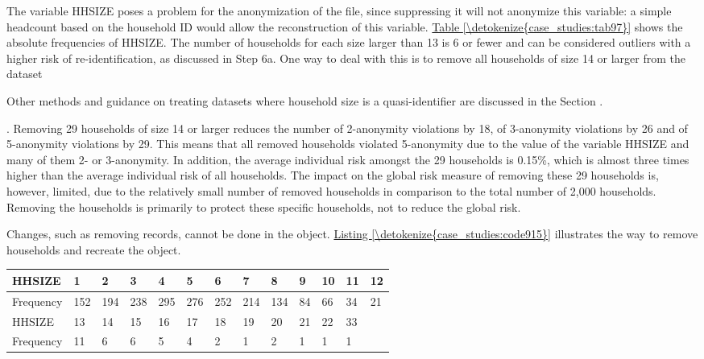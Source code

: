 \documentclass[letterpaper,10pt,english]{sphinxmanual}
\begin{document}

The variable HHSIZE poses a problem for the anonymization of the file,
since suppressing it will not anonymize this variable: a simple
headcount based on the household ID would allow the reconstruction of
this variable. \hyperref[\detokenize{case_studies:tab97}]{Table \ref{\detokenize{case_studies:tab97}}} shows the absolute frequencies of HHSIZE. The
number of households for each size larger than 13 is 6 or fewer and can
be considered outliers with a higher risk of re-identification, as
discussed in Step 6a. One way to deal with this is to remove all
households of size 14 or larger from the dataset %
\begin{footnote}[1]\sphinxAtStartFootnote
Other methods and guidance on treating datasets where household size
is a quasi-identifier are discussed in the Section
.
%
\end{footnote}.
Removing 29 households of size 14 or larger reduces the number of
2-anonymity violations by 18, of 3-anonymity violations by 26 and of
5-anonymity violations by 29. This means that all removed households
violated 5-anonymity due to the value of the variable HHSIZE and many of
them 2- or 3-anonymity. In addition, the average individual risk amongst
the 29 households is 0.15\%, which is almost three times higher than the
average individual risk of all households. The impact on the global risk
measure of removing these 29 households is, however, limited, due to the
relatively small number of removed households in comparison to the total
number of 2,000 households. Removing the households is primarily to
protect these specific households, not to reduce the global risk.

Changes, such as removing records, cannot be done in the
 object. \hyperref[\detokenize{case_studies:code915}]{Listing \ref{\detokenize{case_studies:code915}}} illustrates the way to remove households
and recreate the  object.


\begin{savenotes}\sphinxattablestart
\centering
{}
\label{\detokenize{case_studies:tab97}}\label{\detokenize{case_studies:id21}}
\sphinxaftercaption
\begin{tabulary}{\linewidth}[t]{|T|T|T|T|T|T|T|T|T|T|T|T|T|}
\hline

HHSIZE
&
1
&
2
&
3
&
4
&
5
&
6
&
7
&
8
&
9
&
10
&
11
&
12
\\
\hline
Frequency
&
152
&
194
&
238
&
295
&
276
&
252
&
214
&
134
&
84
&
66
&
34
&
21
\\
\hline
HHSIZE
&
13
&
14
&
15
&
16
&
17
&
18
&
19
&
20
&
21
&
22
&
33
&\\
\hline
Frequency
&
11
&
6
&
6
&
5
&
4
&
2
&
1
&
2
&
1
&
1
&
1
&\\
\hline
\end{tabulary}
\par
\sphinxattableend\end{savenotes}
\end{document}
